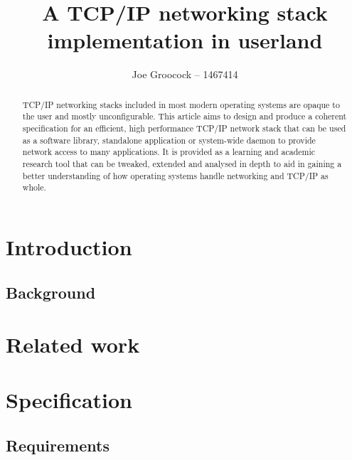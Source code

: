 \documentclass[11pt,a4paper,british,twocolumn]{bhamarticle}
\title{A TCP/IP networking stack implementation in userland}
\author{Joe Groocock -- 1467414} %
\begin{document}
\maketitle

\tableofcontents

\begin{abstract}
    TCP/IP networking stacks included in most modern operating systems are opaque to the user and mostly unconfigurable. This article aims to design and produce a coherent specification for an efficient, high performance TCP/IP network stack that can be used as a software library, standalone application or system-wide daemon to provide network access to many applications. It is provided as a learning and academic research tool that can be tweaked, extended and analysed in depth to aid in gaining a better understanding of how operating systems handle networking and TCP/IP as whole.
\end{abstract}

\section{Introduction}

    \subsection{Background}


\section{Related work}

\section{Specification}
    \subsection{Requirements}
\end{document}
